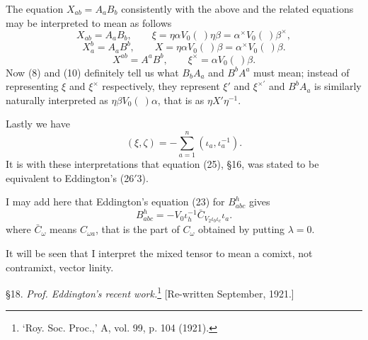 \documentclass[11pt]{article}
\begin{document}
The equation $X_{ab}=A_aB_b$ consistently with the above and the related equations may be interpreted to mean as follows
\begin{equation}X_{ab}=A_aB_b,\qquad \xi=\eta\alpha V_0(\ )\eta\beta=\alpha^\times V_0(\ )\beta^\times,\tag{8}\end{equation}
\begin{equation}X_a^b=A_aB^b,\qquad X=\eta\alpha V_0(\ )\beta=\alpha^\times V_0(\ )\beta.\tag{9}\end{equation}
\begin{equation}X^{ab}=A^aB^b,\qquad \xi^\times=\alpha V_0(\ )\beta.\tag{10}\end{equation}
Now (8) and (10) definitely tell us what $B_bA_a$ and $B^bA^a$ must mean; instead of representing $\xi$ and $\xi^\times$ respectively, they represent $\xi'$ and $\xi^{\times\prime}$ and $B^bA_a$ is similarly naturally interpreted as $\eta\beta V_0(\ )\alpha$, that is as $\eta X'\eta^{-1}$.

\indent Lastly we have
\begin{equation}(\xi,\zeta)=-\sum_{a=1}^n(\iota_a,\iota_a^{-1}).\tag{11}\end{equation}
It is with these interpretations that equation (25), \S16, was stated to be equivalent to Eddington's (26$'$3).

\indent I may add here that Eddington's equation (23) for $B_{abc}^h$ gives
\begin{equation}B_{abc}^h=-V_0\iota_h^{-1}\bar C_{V_2\iota_b\iota_c}\iota_a.\tag{12}\end{equation}
where $\bar C_\omega$ means $C_{\omega a}$, that is the part of $C_\omega$ obtained by putting $\lambda=0$.

\indent It will be seen that I interpret the mixed tensor to mean a comixt, not contramixt, vector linity.

\indent \S18. \emph{Prof. Eddington's recent work.}{\renewcommand{\thefootnote}{*}\footnote{‘Roy. Soc. Proc.,’ A, vol. 99, p. 104 (1921).}} [Re-written September, 1921.]
\end{document}
